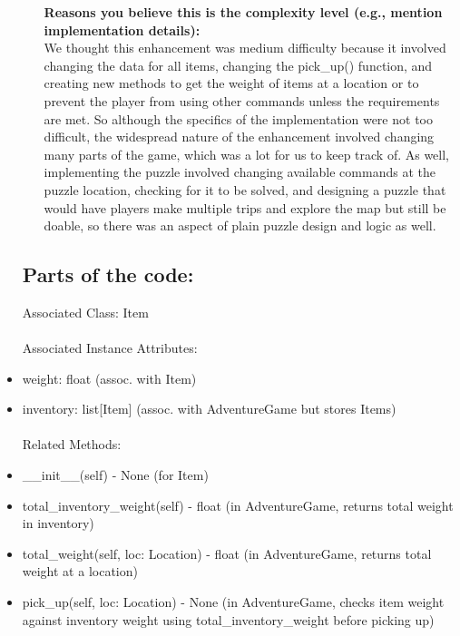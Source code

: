 \documentclass[11pt]{article}
\begin{document}
\begin{itemize}
\begin{itemize}
         \textbf{Reasons you believe this is the complexity level (e.g., mention implementation details):}\\

         We thought this enhancement was medium difficulty because it involved changing the data for all items, changing the pick\_up() function, and creating new methods to get the weight of items at a location or to prevent the player from using other commands unless the requirements are met. So although the specifics of the implementation were not too difficult, the widespread nature of the enhancement involved changing many parts of the game, which was a lot for us to keep track of. As well, implementing the puzzle involved changing available commands at the puzzle location, checking for it to be solved, and designing a puzzle that would have players make multiple trips and explore the map but still be doable, so there was an aspect of plain puzzle design and logic as well.
    \end{itemize}
    \subsection{\textbf{Parts of the code:}}

   Associated Class: Item \\\\
     Associated Instance Attributes:
\item weight: float (assoc. with Item)
\item inventory: list[Item] (assoc. with AdventureGame but stores Items) \\\\
Related Methods:
\item \_\_init\_\_(self) - None (for Item)
\item total\_inventory\_weight(self) - float (in AdventureGame, returns total weight in inventory)
\item total\_weight(self, loc: Location) - float (in AdventureGame, returns total weight at a location)
\item pick\_up(self, loc: Location) - None (in AdventureGame, checks item weight against inventory weight using total\_inventory\_weight before picking up)
\end{itemize}
\end{document}

